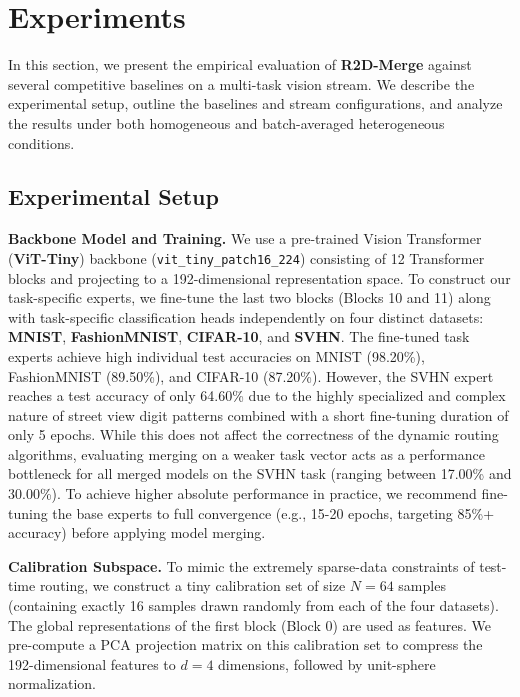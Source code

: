 \section{Experiments}
\label{submission:experiments}

In this section, we present the empirical evaluation of \textbf{R2D-Merge} against several competitive baselines on a multi-task vision stream. We describe the experimental setup, outline the baselines and stream configurations, and analyze the results under both homogeneous and batch-averaged heterogeneous conditions.

\subsection{Experimental Setup}
\textbf{Backbone Model and Training.} We use a pre-trained Vision Transformer (\textbf{ViT-Tiny}) backbone (\texttt{vit\_tiny\_patch16\_224}) consisting of 12 Transformer blocks and projecting to a 192-dimensional representation space. To construct our task-specific experts, we fine-tune the last two blocks (Blocks 10 and 11) along with task-specific classification heads independently on four distinct datasets: \textbf{MNIST}, \textbf{FashionMNIST}, \textbf{CIFAR-10}, and \textbf{SVHN}. The fine-tuned task experts achieve high individual test accuracies on MNIST (98.20\%), FashionMNIST (89.50\%), and CIFAR-10 (87.20\%). However, the SVHN expert reaches a test accuracy of only 64.60\% due to the highly specialized and complex nature of street view digit patterns combined with a short fine-tuning duration of only 5 epochs. While this does not affect the correctness of the dynamic routing algorithms, evaluating merging on a weaker task vector acts as a performance bottleneck for all merged models on the SVHN task (ranging between 17.00\% and 30.00\%). To achieve higher absolute performance in practice, we recommend fine-tuning the base experts to full convergence (e.g., 15-20 epochs, targeting 85\%+ accuracy) before applying model merging. 

\textbf{Calibration Subspace.} To mimic the extremely sparse-data constraints of test-time routing, we construct a tiny calibration set of size $N=64$ samples (containing exactly 16 samples drawn randomly from each of the four datasets). The global representations of the first block (Block 0) are used as features. We pre-compute a PCA projection matrix on this calibration set to compress the 192-dimensional features to $d=4$ dimensions, followed by unit-sphere normalization.

